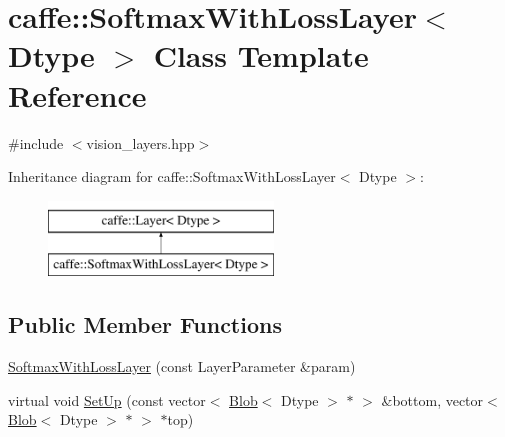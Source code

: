 \hypertarget{classcaffe_1_1_softmax_with_loss_layer}{\section{caffe\+:\+:Softmax\+With\+Loss\+Layer$<$ Dtype $>$ Class Template Reference}
\label{classcaffe_1_1_softmax_with_loss_layer}
}


{\ttfamily \#include $<$vision\+\_\+layers.\+hpp$>$}

Inheritance diagram for caffe\+:\+:Softmax\+With\+Loss\+Layer$<$ Dtype $>$\+:\begin{figure}[H]
\begin{center}
\leavevmode
\includegraphics[height=2.000000cm]{classcaffe_1_1_softmax_with_loss_layer}
\end{center}
\end{figure}
\subsection*{Public Member Functions}
\begin{DoxyCompactItemize}
\item 
\hyperlink{classcaffe_1_1_softmax_with_loss_layer_ac3a01d6846a9b62c1790635d53185e81}{Softmax\+With\+Loss\+Layer} (const Layer\+Parameter \&param)
\item 
virtual void \hyperlink{classcaffe_1_1_softmax_with_loss_layer_a4e29194f599dc4f08b5aa48a4f9cf87e}{Set\+Up} (const vector$<$ \hyperlink{classcaffe_1_1_blob}{Blob}$<$ Dtype $>$ $\ast$ $>$ \&bottom, vector$<$ \hyperlink{classcaffe_1_1_blob}{Blob}$<$ Dtype $>$ $\ast$ $>$ $\ast$top)
\end{DoxyCompactItemize}
